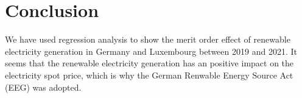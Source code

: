 \documentclass{article}
\begin{document}


\section{Conclusion}

We have used regression analysis to show the merit order effect of renewable electricity generation in Germany and Luxembourg between 2019 and 2021.
It seems that the renewable electricity generation has an positive impact on the electricity spot price, which is why the German Renwable Energy Source Act (EEG) was adopted. 



\end{document}
